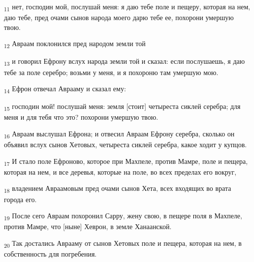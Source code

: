 \begin{tcolorbox}
\textsubscript{11} нет, господин мой, послушай меня: я даю тебе поле и пещеру, которая на нем, даю тебе, пред очами сынов народа моего дарю тебе ее, похорони умершую твою.
\end{tcolorbox}
\begin{tcolorbox}
\textsubscript{12} Авраам поклонился пред народом земли той
\end{tcolorbox}
\begin{tcolorbox}
\textsubscript{13} и говорил Ефрону вслух народа земли той и сказал: если послушаешь, я даю тебе за поле серебро; возьми у меня, и я похороню там умершую мою.
\end{tcolorbox}
\begin{tcolorbox}
\textsubscript{14} Ефрон отвечал Аврааму и сказал ему:
\end{tcolorbox}
\begin{tcolorbox}
\textsubscript{15} господин мой! послушай меня: земля [стоит] четыреста сиклей серебра; для меня и для тебя что это? похорони умершую твою.
\end{tcolorbox}
\begin{tcolorbox}
\textsubscript{16} Авраам выслушал Ефрона; и отвесил Авраам Ефрону серебра, сколько он объявил вслух сынов Хетовых, четыреста сиклей серебра, какое ходит у купцов.
\end{tcolorbox}
\begin{tcolorbox}
\textsubscript{17} И стало поле Ефроново, которое при Махпеле, против Мамре, поле и пещера, которая на нем, и все деревья, которые на поле, во всех пределах его вокруг,
\end{tcolorbox}
\begin{tcolorbox}
\textsubscript{18} владением Авраамовым пред очами сынов Хета, всех входящих во врата города его.
\end{tcolorbox}
\begin{tcolorbox}
\textsubscript{19} После сего Авраам похоронил Сарру, жену свою, в пещере поля в Махпеле, против Мамре, что [ныне] Хеврон, в земле Ханаанской.
\end{tcolorbox}
\begin{tcolorbox}
\textsubscript{20} Так достались Аврааму от сынов Хетовых поле и пещера, которая на нем, в собственность для погребения.
\end{tcolorbox}
